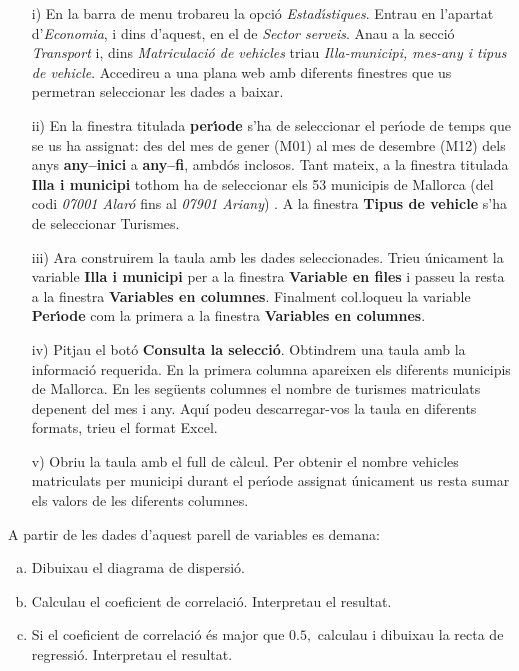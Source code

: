 \documentclass[11pt]{article}
\begin{document}
\begin{itemize}
\item [i)] En la barra de menu trobareu la opci\'o \textit{Estad\'{\i}stiques}. Entrau en l'apartat d'\textit{Economia}, i dins d'aquest, en el de \textit{Sector serveis}. 
Anau a la secci\'o \textit{Transport} i, dins \textit{Matriculaci\'o de vehicles} triau 
\textit{Illa-municipi, mes-any i tipus de vehicle}. 
Accedireu a una plana web amb diferents finestres que us permetran seleccionar les dades a baixar.
\item [ii)] En la finestra titulada \textbf{per\'{\i}ode} s'ha de seleccionar el per\'{\i}ode de temps que se us ha assignat: des del mes de gener (M01) al mes de desembre (M12) dels anys \textbf{any--inici}  a \textbf{any--fi}, ambd\'os inclosos. Tant mateix, a la finestra titulada \textbf{Illa i municipi} tothom ha de seleccionar els 53 municipis de Mallorca (del codi \textit{07001 Alar\'o} fins al \textit{07901 Ariany}) . A la finestra \textbf{Tipus de vehicle} s'ha de seleccionar Turismes.
\item [iii)] Ara construirem la taula amb les dades seleccionades. Trieu \'unicament la variable \textbf{Illa i municipi} per a la finestra \textbf{Variable en files} i passeu la resta a la finestra \textbf{Variables en columnes}. Finalment col.loqueu la variable \textbf{Per\'{\i}ode} com la primera a la finestra \textbf{Variables en columnes}.
\item [iv)] Pitjau el bot\'o \textbf{Consulta la selecci\'o}. Obtindrem una taula amb la informaci\'o requerida. En la primera columna apareixen els diferents municipis de Mallorca. En les seg\"uents columnes el nombre de turismes matriculats depenent del mes i any. Aqu\'i podeu descarregar-vos la taula en diferents formats, trieu el format Excel.
\item [v)] Obriu la taula amb el full de c\`alcul. Per obtenir el nombre vehicles matriculats per municipi durant el per\'{\i}ode assignat \'unicament us resta sumar els valors de les diferents columnes. 
\end{itemize}

A partir de les dades d'aquest parell de variables es demana:

\begin{enumerate}[a)]
\item Dibuixau el diagrama de dispersi\'o.
\item Calculau el coeficient de correlaci\'o. Interpretau el resultat.
\item Si el coeficient de correlaci\'o \'es major que $0.5,$ calculau i dibuixau la recta de regressi\'o. Interpretau el resultat.
\end{enumerate}
\end{document}
